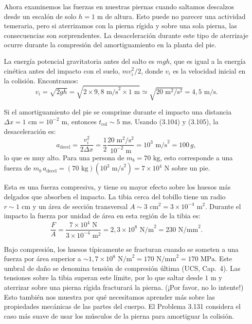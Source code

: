 \documentclass[12pt]{book}
\begin{document}
Ahora examinemos las fuerzas en nuestras piernas cuando saltamos descalzos desde un escalón de solo $h = 1\text{ m}$ de altura. Esto puede no parecer una actividad temeraria, pero si aterrizamos con la pierna rígida y sobre una sola pierna, las consecuencias son sorprendentes. La desaceleración durante este tipo de aterrizaje ocurre durante la compresión del amortiguamiento en la planta del pie.

La energía potencial gravitatoria antes del salto es $mgh$, que es igual a la energía cinética antes del impacto con el suelo, $mv_i^2/2$, donde $v_i$ es la velocidad inicial en la colisión. Encontramos:
\begin{equation}
v_i = \sqrt{2gh} = \sqrt{2 \times 9{,}8\text{ m/s}^2 \times 1\text{ m}} \simeq \sqrt{20\text{ m}^2/\text{s}^2} = 4{,}5\text{ m/s}.
\label{eq:3.112}
\end{equation}

Si el amortiguamiento del pie se comprime durante el impacto una distancia $\Delta x = 1\text{ cm} = 10^{-2}\text{ m}$, entonces $t_{\text{col}} \sim 5\text{ ms}$. Usando (3.104) y (3.105), la desaceleración es:
\begin{equation}
a_{\text{decel}} = \frac{v_i^2}{2\Delta x} = \frac{1}{2}\frac{20\text{ m}^2/\text{s}^2}{10^{-2}\text{ m}} = 10^3\text{ m/s}^2 = 100\,g,
\label{eq:3.113}
\end{equation}
lo que es muy alto. Para una persona de $m_b = 70\text{ kg}$, esto corresponde a una fuerza de $m_b\,a_{\text{decel}} = (70\text{ kg})(10^3\text{ m/s}^2) = 7 \times 10^4\text{ N}$ sobre un pie.

Esta es una fuerza compresiva, y tiene su mayor efecto sobre los huesos más delgados que absorben el impacto. La tibia cerca del tobillo tiene un radio $r \sim 1\text{ cm}$ y un área de sección transversal $A \sim 3\text{ cm}^2 = 3 \times 10^{-4}\text{ m}^2$. Durante el impacto la fuerza por unidad de área en esta región de la tibia es:
\begin{equation}
\frac{F}{A} = \frac{7 \times 10^4\text{ N}}{3 \times 10^{-4}\text{ m}^2} = 2{,}3 \times 10^8\text{ N/m}^2 = 230\text{ N/mm}^2.
\label{eq:3.114}
\end{equation}

Bajo compresión, los huesos típicamente se fracturan cuando se someten a una fuerza por área superior a $\sim 1{,}7 \times 10^8\text{ N/m}^2 = 170\text{ N/mm}^2 = 170\text{ MPa}$. Este umbral de daño se denomina tensión de compresión última (UCS, Cap.~4). Las tensiones sobre la tibia superan este límite, por lo que saltar desde $1\text{ m}$ y aterrizar sobre una pierna rígida fracturará la pierna. (¡Por favor, no lo intente!) Esto también nos muestra por qué necesitamos aprender más sobre las propiedades mecánicas de las partes del cuerpo. El Problema 3.131 considera el caso más suave de usar los músculos de la pierna para amortiguar la colisión.
\end{document}
